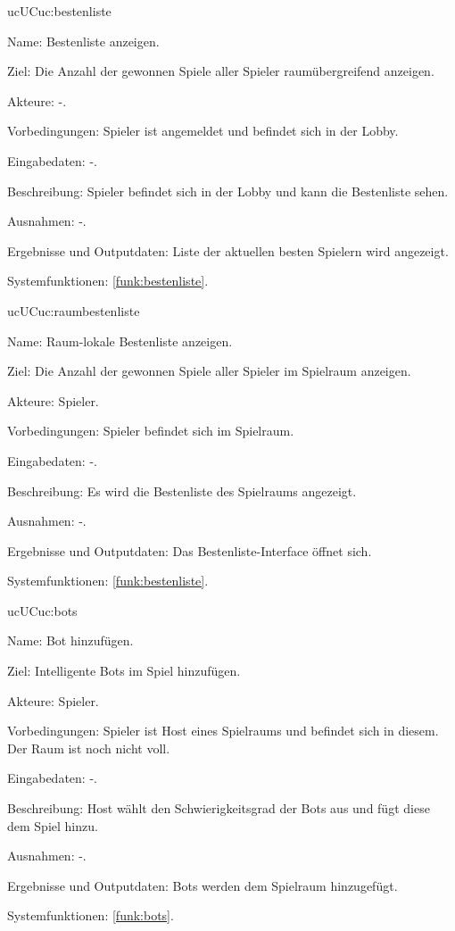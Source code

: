 \begin{description}[leftmargin=5em, style=sameline]
	\begin{lhp}{uc}{UC}{uc:bestenliste} %
		\item [Name:] Bestenliste anzeigen.
		\item [Ziel:] Die Anzahl der gewonnen Spiele aller Spieler raumübergreifend anzeigen.
		\item [Akteure:] -.
		\item [Vorbedingungen:] Spieler ist angemeldet und befindet sich in der Lobby.
		\item [Eingabedaten:] -.
		\item [Beschreibung:] Spieler befindet sich in der Lobby und kann die Bestenliste sehen.
		\item [Ausnahmen:] -.
		\item [Ergebnisse und Outputdaten:] Liste der aktuellen besten Spielern wird angezeigt.
		\item [Systemfunktionen:] \ref{funk:bestenliste}. %
	\end{lhp}
	
		\begin{lhp}{uc}{UC}{uc:raumbestenliste} %
		\item [Name:] Raum-lokale Bestenliste anzeigen.
		\item [Ziel:] Die Anzahl der gewonnen Spiele aller Spieler im Spielraum anzeigen.
		\item [Akteure:] Spieler.
		\item [Vorbedingungen:] Spieler befindet sich im Spielraum.
		\item [Eingabedaten:] -.
		\item [Beschreibung:]  Es wird die Bestenliste des Spielraums angezeigt.
		\item [Ausnahmen:] -.
		\item [Ergebnisse und Outputdaten:]  Das Bestenliste-Interface öffnet sich.
		\item [Systemfunktionen:] \ref{funk:bestenliste}. %
	\end{lhp}
	
	\begin{lhp}{uc}{UC}{uc:bots}
		\item [Name:] Bot hinzufügen.
		\item [Ziel:] Intelligente Bots im Spiel hinzufügen.
		\item [Akteure:] Spieler. 
		\item [Vorbedingungen:]  Spieler ist Host eines Spielraums und befindet sich in diesem. Der Raum ist noch nicht voll.
		\item [Eingabedaten:] -. %
		\item [Beschreibung:] Host wählt den Schwierigkeitsgrad der Bots aus und fügt diese dem Spiel hinzu.
		\item [Ausnahmen:] -.
		\item [Ergebnisse und Outputdaten:] Bots werden dem Spielraum hinzugefügt.
		\item [Systemfunktionen:] \ref{funk:bots}. %
	\end{lhp}
	

\end{description}
